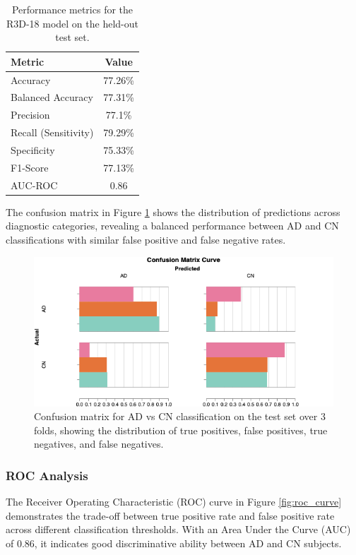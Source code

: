 \documentclass[12pt, a4paper]{article}
\begin{document}
\begin{table}[htbp]
\centering
\begin{tabular}{|l|c|}
\hline
\textbf{Metric} & \textbf{Value} \\
\hline
Accuracy & 77.26\% \\
Balanced Accuracy & 77.31\% \\
Precision & 77.1\% \\
Recall (Sensitivity) & 79.29\% \\
Specificity & 75.33\% \\
F1-Score & 77.13\% \\
AUC-ROC & 0.86 \\
\hline
\end{tabular}
\caption{Performance metrics for the R3D-18 model on the held-out test set.}
\label{tab:performance_metrics}
\end{table}

The confusion matrix in Figure \ref{fig:confusion_matrix} shows the distribution of predictions across diagnostic categories, revealing a balanced performance between AD and CN classifications with similar false positive and false negative rates.

\begin{figure}[htbp]
  \centering
  \includegraphics[width=\textwidth]{figures/CM3F.png}
  \caption{Confusion matrix for AD vs CN classification on the test set over 3 folds, showing the distribution of true positives, false positives, true negatives, and false negatives.}
  \label{fig:confusion_matrix}
\end{figure}

\subsubsection{ROC Analysis}

The Receiver Operating Characteristic (ROC) curve in Figure \ref{fig:roc_curve} demonstrates the trade-off between true positive rate and false positive rate across different classification thresholds. With an Area Under the Curve (AUC) of 0.86, it indicates good discriminative ability between AD and CN subjects.
\end{document}
